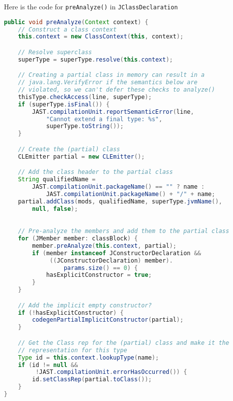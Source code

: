 \documentclass[8pt,a4paper,compress]{beamer}
\begin{document}
\begin{frame}[fragile]
\pause

Here is the code for \lstinline{preAnalyze()} in \lstinline{JClassDeclaration}
\begin{lstlisting}[language=Java,style=focusin]
public void preAnalyze(Context context) {
    // Construct a class context
    this.context = new ClassContext(this, context);

    // Resolve superclass
    superType = superType.resolve(this.context);

    // Creating a partial class in memory can result in a
    // java.lang.VerifyError if the semantics below are
    // violated, so we can't defer these checks to analyze()
    thisType.checkAccess(line, superType);
    if (superType.isFinal()) {
        JAST.compilationUnit.reportSemanticError(line,
            "Cannot extend a final type: %s",                                   
            superType.toString());
    }

    // Create the (partial) class
    CLEmitter partial = new CLEmitter();

    // Add the class header to the partial class
    String qualifiedName =
        JAST.compilationUnit.packageName() == "" ? name :
            JAST.compilationUnit.packageName() + "/" + name;
    partial.addClass(mods, qualifiedName, superType.jvmName(),
        null, false);
\end{lstlisting}
\end{frame}

\begin{frame}[fragile]
\pause

\begin{lstlisting}[language=Java,style=focusin]

    // Pre-analyze the members and add them to the partial class
    for (JMember member: classBlock) {
        member.preAnalyze(this.context, partial);
        if (member instanceof JConstructorDeclaration &&
             ((JConstructorDeclaration) member).
                 params.size() == 0) {
            hasExplicitConstructor = true;
        }
    }

    // Add the implicit empty constructor?
    if (!hasExplicitConstructor) {
        codegenPartialImplicitConstructor(partial);
    }

    // Get the Class rep for the (partial) class and make it the
    // representation for this type
    Type id = this.context.lookupType(name);
    if (id != null &&
         !JAST.compilationUnit.errorHasOccurred()) {
        id.setClassRep(partial.toClass());
    }
}
\end{lstlisting}
\end{frame}
\end{document}
